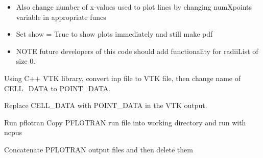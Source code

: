 \documentclass[letterpaper,10pt,english]{sphinxmanual}
\begin{document}
\begin{fulllineitems}
\begin{fulllineitems}
\begin{description}
\begin{itemize}
\item {} 
Also change number of x-values used to plot lines by changing numXpoints variable in appropriate funcs

\item {} 
Set show = True to show plots immediately and still make pdf

\item {} 
NOTE future developers of this code should add functionality for radiiList of size 0.

\end{itemize}

\end{description}

\end{fulllineitems}


\begin{fulllineitems}
\label{pydfnworks:pydfnworks.DFNWORKS.parse_pflotran_vtk}
Using C++ VTK library, convert inp file to VTK file, then change name of CELL\_DATA to POINT\_DATA.

\end{fulllineitems}


\begin{fulllineitems}
\label{pydfnworks:pydfnworks.DFNWORKS.parse_pflotran_vtk_python}
Replace CELL\_DATA with POINT\_DATA in the VTK output.

\end{fulllineitems}


\begin{fulllineitems}
\label{pydfnworks:pydfnworks.DFNWORKS.pflotran}
Run pflotran
Copy PFLOTRAN run file into working directory and run with ncpus

\end{fulllineitems}


\begin{fulllineitems}
\label{pydfnworks:pydfnworks.DFNWORKS.pflotran_cleanup}
Concatenate PFLOTRAN output files and then delete them


\end{fulllineitems}
\end{fulllineitems}
\end{document}
